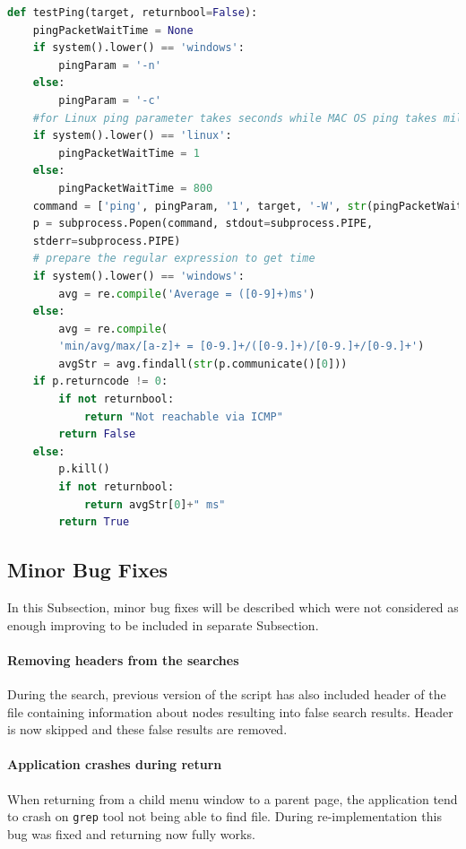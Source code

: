 {{{{{{{\noindent\begin{minipage}{\linewidth}
		\begin{lstlisting}[language=Python, numbers=none, label={lst:testping}, caption=Multi-Platform Function testPing, frame=single, showstringspaces=false, breaklines=true]
def testPing(target, returnbool=False):
	pingPacketWaitTime = None
	if system().lower() == 'windows':
		pingParam = '-n'
	else:
		pingParam = '-c'
	#for Linux ping parameter takes seconds while MAC OS ping takes miliseconds
	if system().lower() == 'linux':
		pingPacketWaitTime = 1
	else:
		pingPacketWaitTime = 800
	command = ['ping', pingParam, '1', target, '-W', str(pingPacketWaitTime)]
	p = subprocess.Popen(command, stdout=subprocess.PIPE,
	stderr=subprocess.PIPE)
	# prepare the regular expression to get time
	if system().lower() == 'windows':
		avg = re.compile('Average = ([0-9]+)ms')
	else:
		avg = re.compile(
		'min/avg/max/[a-z]+ = [0-9.]+/([0-9.]+)/[0-9.]+/[0-9.]+')
		avgStr = avg.findall(str(p.communicate()[0]))
	if p.returncode != 0:
		if not returnbool:
			return "Not reachable via ICMP"
		return False
	else:
		p.kill()
		if not returnbool:
			return avgStr[0]+" ms"
		return True
		\end{lstlisting}
	\end{minipage}

\subsection{Minor Bug Fixes}
In this Subsection, minor bug fixes will be described which were not considered as enough improving to be included in separate Subsection. 
\paragraph{Removing headers from the searches}
During the search, previous version of the script has also included header of the file containing information about nodes resulting into false search results. Header is now skipped and these false results are removed.
\paragraph{Application crashes during return}
When returning from a child menu window to a parent page, the application tend to crash on \texttt{grep} tool not being able to find file. During re-implementation this bug was fixed and returning now fully works.

}}}}}}}
